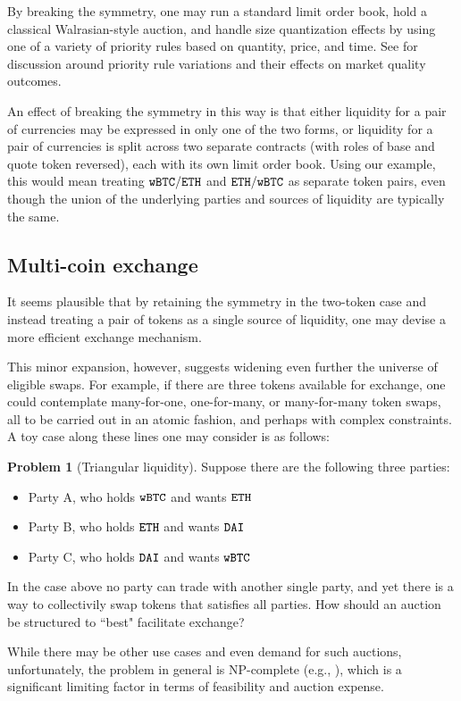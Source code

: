 \documentclass[11pt, reqno]{amsart}
\theoremstyle{definition}
\newtheorem{problem}{Problem}[subsection]
\theoremstyle{remark}
\newcommand{\BTC}{\textnormal{\texttt{wBTC}}}
\newcommand{\ETH}{\textnormal{\texttt{ETH}}}
\newcommand{\DAI}{\textnormal{\texttt{DAI}}}
\begin{document}
By breaking the symmetry, one may run a standard limit order book, hold a
classical Walrasian-style auction, and handle size quantization effects by
using one of a variety of priority rules based on quantity, price, and time.
See \cite{BeLaLiVa22} for discussion around priority rule variations and their
effects on market quality outcomes.

An effect of breaking the symmetry in this way is that either liquidity for a
pair of currencies may be expressed in only one of the two forms, or liquidity
for a pair of currencies is split across two separate contracts (with roles of
base and quote token reversed), each with its own limit order book.
Using our example, this would mean treating $\BTC/\ETH$ and $\ETH/\BTC$ as
separate token pairs, even though the union of the underlying parties and
sources of liquidity are typically the same.

\subsection{Multi-coin exchange}
It seems plausible that by retaining the symmetry in the two-token case and
instead treating a pair of tokens as a single source of liquidity, one may
devise a more efficient exchange mechanism.

This minor expansion, however, suggests widening even further the universe of
eligible swaps. For example, if there are three tokens available for exchange,
one could contemplate many-for-one, one-for-many, or many-for-many token swaps,
all to be carried out in an atomic fashion, and perhaps with complex
constraints. A toy case along these lines one may consider is as follows:

\begin{problem}[Triangular liquidity]
Suppose there are the following three parties:
\begin{itemize}
	\item Party A, who holds $\BTC$ and wants $\ETH$
	\item Party B, who holds $\ETH$ and wants $\DAI$
	\item Party C, who holds $\DAI$ and wants $\BTC$
\end{itemize}

In the case above no party can trade with another single party, and yet there
is a way to collectivily swap tokens that satisfies all parties.
How should an auction be structured to ``best" facilitate exchange?
\end{problem}
While there may be other use cases and even demand for such auctions,
unfortunately, the problem in general is NP-complete (e.g., \cite{XiStWh05}),
which is a significant limiting factor in terms of feasibility and
auction expense.
\end{document}

